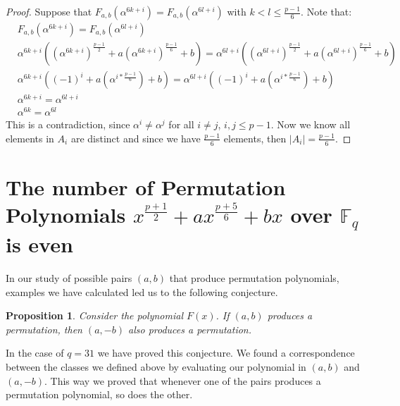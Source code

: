 \documentclass[12pt]{article}
\newtheorem{proposition}{Proposition}
\begin{document}
\begin{proof}
	Suppose that $F_{a,b}(\alpha^{6k+i})=F_{a,b}(\alpha^{6l+i})$ with $k<l\leq \frac{p-1}{6}$. Note that:
	\begin{align*}
	&F_{a,b}(\alpha^{6k+i})=F_{a,b}(\alpha^{6l+i}) \\
	&\alpha^{6k+i}((\alpha^{6k+i})^{\frac{p-1}{2}}+a(\alpha^{6k+i})^{\frac{p-1}{6}}+b) = \alpha^{6l+i}((\alpha^{6l+i})^{\frac{p-1}{2}}+a(\alpha^{6l+i})^{\frac{p-1}{6}}+b) \\
	&\alpha^{6k+i}((-1)^{i}+a(\alpha^{i*\frac{p-1}{6}})+b) = \alpha^{6l+i}((-1)^{i}+a(\alpha^{i*\frac{p-1}{6}})+b) \\
	&\alpha^{6k+i} = \alpha^{6l+i} \\
	&\alpha^{6k} = \alpha^{6l}
	\end{align*}
	This is a contradiction, since $\alpha^{i} \neq \alpha^{j}$ for all $i \neq j$, $i,j \leq p-1$. Now we know all elements in $A_{i}$ are distinct and since we have $\frac{p-1}{6}$ elements, then $\left\vert A_{i} \right\vert = \frac{p-1}{6}$.
\end{proof}

\section{The number of Permutation Polynomials $x^{\frac{p+1}{2}} + ax^{\frac{p+5}{6}} + bx$ over $\mathbb{F}_{q}$ is even}\label{divby2}


In our study of possible pairs $(a,b)$ that produce permutation polynomials, examples we have calculated led us to the following conjecture.
\begin{proposition}
	Consider the polynomial $F(x)$. If $(a,b)$ produces a permutation, then $(a,-b)$ also produces a permutation.
\end{proposition}

In the case of $q=31$ we have proved this conjecture. We found a correspondence between the classes we defined above by evaluating our polynomial in $(a,b)$ and $(a,-b)$. This way we proved that whenever one of the pairs produces a permutation polynomial, so does the other.
\end{document}
